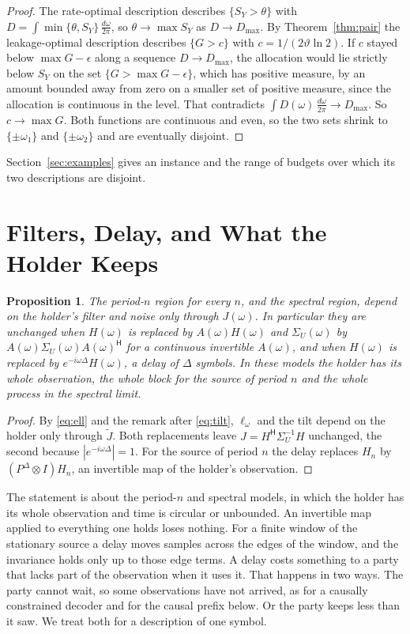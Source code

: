 \documentclass[11pt,onecolumn]{IEEEtran}
\newtheorem{proposition}[theorem]{Proposition}
\newcommand{\dw}{\tfrac{d\omega}{2\pi}}
\newcommand{\herm}{\mathsf H}
\begin{document}
\begin{proof}
The rate-optimal description describes $\{S_Y>\theta\}$ with
$D=\int\min\{\theta,S_Y\}\,\dw$, so $\theta\to\max S_Y$ as $D\to D_{\max}$.
By Theorem~\ref{thm:pair} the leakage-optimal description describes
$\{G>c\}$ with $c=1/(2\vartheta\ln2)$. If $c$ stayed below
$\max G-\epsilon$ along a sequence $D\to D_{\max}$, the allocation would
lie strictly below $S_Y$ on the set $\{G>\max G-\epsilon\}$, which has
positive measure, by an amount bounded away from zero on a smaller set
of positive measure, since the allocation is continuous in the level.
That contradicts $\int D(\omega)\,\dw\to D_{\max}$. So $c\to\max G$. Both
functions are continuous and even, so the two sets shrink to
$\{\pm\omega_1\}$ and $\{\pm\omega_2\}$ and are eventually disjoint.
\end{proof}

Section~\ref{sec:examples} gives an instance and the range of budgets
over which its two descriptions are disjoint.

\section{Filters, Delay, and What the Holder Keeps}
\label{sec:retention}

\begin{proposition}\label{prop:allpass}
The period-$n$ region for every $n$, and the spectral region, depend on
the holder's filter and noise only through $J(\omega)$. In particular
they are unchanged when $H(\omega)$ is replaced by $A(\omega)H(\omega)$
and $\Sigma_U(\omega)$ by $A(\omega)\Sigma_U(\omega)A(\omega)^{\herm}$ for a
continuous invertible $A(\omega)$, and when $H(\omega)$ is replaced by
$e^{-i\omega\Delta}H(\omega)$, a delay of $\Delta$ symbols. In these
models the holder has its whole observation, the whole block for the
source of period $n$ and the whole process in the spectral limit.
\end{proposition}

\begin{proof}
By \eqref{eq:ell} and the remark after \eqref{eq:tilt}, $\ell_\omega$ and
the tilt depend on the holder only through $\tilde J$. Both
replacements leave $J=H^{\herm}\Sigma_U^{-1}H$ unchanged, the second
because $|e^{-i\omega\Delta}|=1$. For the source of period $n$ the delay
replaces $H_n$ by $(P^\Delta\otimes I)H_n$, an invertible map of the
holder's observation.
\end{proof}

The statement is about the period-$n$ and spectral models, in which the
holder has its whole observation and time is circular or unbounded. An
invertible map applied to everything one holds loses nothing. For a
finite window of the stationary source a delay moves samples across the
edges of the window, and the invariance holds only up to those edge
terms. A delay costs something to a party that lacks part of the
observation when it uses it. That happens in two ways. The party cannot
wait, so some observations have not arrived, as for a causally
constrained decoder \cite{simeone2013} and for the causal prefix below.
Or the party keeps less than it saw. We treat both for a description of
one symbol.
\end{document}
